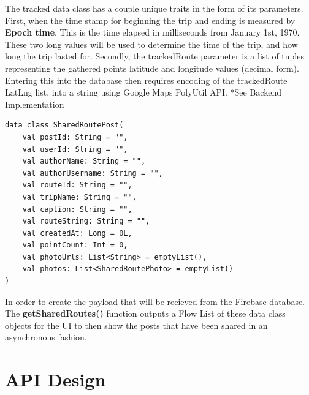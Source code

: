 \documentclass{article}
\begin{document}
            The tracked data class has a couple unique traits in the form of its parameters. First, 
            when the time stamp for beginning the trip and ending is measured by \textbf{Epoch time}.
            This is the time elapsed in milliseconds from January 1st, 1970. These two long values 
            will be used to determine the time of the trip, and how long the trip lasted for. Secondly, 
            the trackedRoute parameter is a list of tuples representing the gathered points latitude and
            longitude values (decimal form). Entering this into the database then requires encoding
            of the trackedRoute LatLng list, into a string using Google Maps PolyUtil API. *See Backend 
            Implementation

            \begin{center}
                \begin{verbatim}
data class SharedRoutePost(
    val postId: String = "",
    val userId: String = "",
    val authorName: String = "",
    val authorUsername: String = "",
    val routeId: String = "",
    val tripName: String = "",
    val caption: String = "",
    val routeString: String = "",
    val createdAt: Long = 0L,
    val pointCount: Int = 0,
    val photoUrls: List<String> = emptyList(),
    val photos: List<SharedRoutePhoto> = emptyList()
)
                \end{verbatim}
            \end{center}

            In order to create the payload that will be recieved from the Firebase database.
            The \textbf{getSharedRoutes()} function outputs a Flow List of these data class 
            objects for the UI to then show the posts that have been shared in an asynchronous
            fashion.
            


    \newpage

    \section{API Design}
\end{document}
